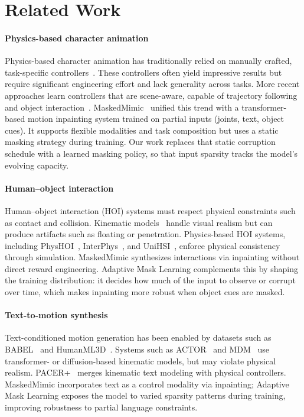 \documentclass[10pt,letterpaper]{article}
\begin{document}
\section{Related Work}

\paragraph{Physics-based character animation}
Physics-based character animation has traditionally relied on manually crafted, task-specific controllers~\cite{delasa2010feature,geijtenbeek2013flexible,lee2002interactive,liu2010sampling}. These controllers often yield impressive results but require significant engineering effort and lack generality across tasks. More recent approaches learn controllers that are scene-aware, capable of trajectory following~\cite{rempe2023trace} and object interaction~\cite{hassan2023interphys}. MaskedMimic~\cite{tessler2024maskedmimic} unified this trend with a transformer-based motion inpainting system trained on partial inputs (joints, text, object cues). It supports flexible modalities and task composition but uses a static masking strategy during training. Our work replaces that static corruption schedule with a learned masking policy, so that input sparsity tracks the model's evolving capacity.

\paragraph{Human--object interaction}
Human--object interaction (HOI) systems must respect physical constraints such as contact and collision. Kinematic models~\cite{wang2021synthesizing,xu2023interdiff} handle visual realism but can produce artifacts such as floating or penetration. Physics-based HOI systems, including PhysHOI~\cite{wang2023physhoi}, InterPhys~\cite{hassan2023interphys}, and UniHSI~\cite{xiao2024unihsi}, enforce physical consistency through simulation. MaskedMimic synthesizes interactions via inpainting without direct reward engineering. Adaptive Mask Learning complements this by shaping the training distribution: it decides how much of the input to observe or corrupt over time, which makes inpainting more robust when object cues are masked.

\paragraph{Text-to-motion synthesis}
Text-conditioned motion generation has been enabled by datasets such as BABEL~\cite{punnakkal2021babel} and HumanML3D~\cite{guo2022humanml3d}. Systems such as ACTOR~\cite{petrovich2021actor} and MDM~\cite{tevet2023mdm} use transformer- or diffusion-based kinematic models, but may violate physical realism. PACER+~\cite{wang2024pacerplus} merges kinematic text modeling with physical controllers. MaskedMimic incorporates text as a control modality via inpainting; Adaptive Mask Learning exposes the model to varied sparsity patterns during training, improving robustness to partial language constraints.
\end{document}
